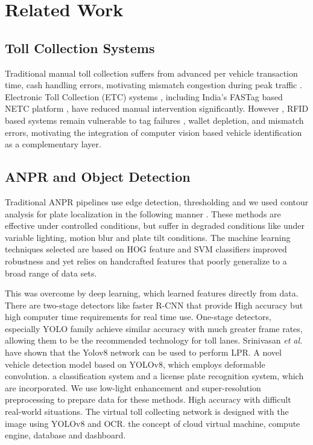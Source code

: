 \documentclass[conference]{IEEEtran}
\begin{document}
\section{Related Work}

\subsection{Toll Collection Systems}

Traditional manual toll collection suffers from advanced per vehicle transaction time, cash handling errors, motivating mismatch congestion during peak traffic \cite{fastag_npci}. Electronic Toll Collection (ETC) systems , including India's FASTag based NETC platform \cite{ihmcl}, have reduced manual intervention significantly. However , RFID based systems remain vulnerable to tag failures , wallet depletion, and mismatch errors, motivating the integration of computer vision based vehicle identification as a complementary layer.

\subsection{ANPR and Object Detection}

Traditional ANPR pipelines use edge detection, thresholding and
we used contour analysis for plate localization in the following manner \cite{otsu1979}.
These methods are effective under controlled conditions, but suffer in degraded conditions like under variable lighting, motion blur and plate tilt conditions.
The machine learning techniques selected are based on HOG feature and SVM classifiers 
improved robustness and yet relies on handcrafted features that
poorly generalize to a broad range of data sets.

This was overcome by deep learning, which learned features directly from
data.
There are two-stage detectors like faster R-CNN \cite{faster_rcnn} that provide
High accuracy but high computer time requirements for real time use.
One-stage detectors, especially YOLO family \cite{yolo_orig}
achieve similar accuracy with much greater frame rates, allowing them to be
the recommended technology for toll lanes.
Srinivasan \emph{et al.} have shown that the Yolov8 network \cite{yolov8_lpr} can be used to perform LPR.
A novel vehicle detection model based on YOLOv8, which employs deformable convolution.
a classification system and a license plate recognition system, which are incorporated.
We use low-light enhancement and super-resolution preprocessing to prepare data for these methods.
High accuracy with difficult real-world situations.
The virtual toll collecting network is designed with the image using YOLOv8 and OCR.
the concept of cloud virtual machine, compute engine, database and dashboard.
\end{document}
